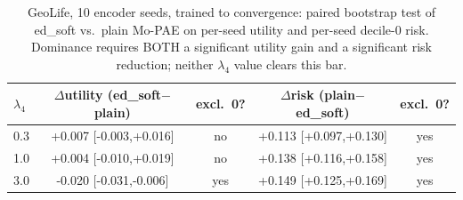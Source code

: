 \begin{table}[t]
\centering
\caption{GeoLife, 10 encoder seeds, trained to convergence: paired bootstrap test of ed\_soft vs.\ plain Mo-PAE on per-seed utility and per-seed decile-0 risk. Dominance requires BOTH a significant utility gain and a significant risk reduction; neither $\lambda_4$ value clears this bar.}
\label{tab:geolife-10seed-dominance}
\small
\begin{tabular}{@{}lcccc@{}}
\toprule
$\lambda_4$ & $\Delta$utility (ed\_soft$-$plain) & excl.\ 0? & $\Delta$risk (plain$-$ed\_soft) & excl.\ 0? \\
\midrule
0.3 & +0.007 [-0.003,+0.016] & no & +0.113 [+0.097,+0.130] & yes \\
1.0 & +0.004 [-0.010,+0.019] & no & +0.138 [+0.116,+0.158] & yes \\
3.0 & -0.020 [-0.031,-0.006] & yes & +0.149 [+0.125,+0.169] & yes \\
\bottomrule
\end{tabular}
\end{table}
